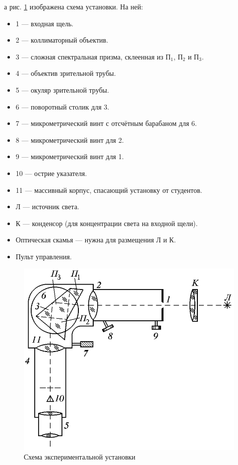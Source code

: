 \documentclass[a4paper, 12pt]{article}
\begin{document}
а рис. \ref{img:work} изображена схема установки. На ней:

\begin{itemize}
    \item 1 --- входная щель.
    \item 2 --- коллиматорный объектив.
    \item 3 --- сложная спектральная призма, склеенная из $П_1$, $П_2$ и $П_3$.
    \item 4 --- объектив зрительной трубы.
    \item 5 --- окуляр зрительной трубы.
    \item 6 --- поворотный столик для 3.
    \item 7 --- микрометрический винт с отсчётным барабаном для 6.
    \item 8 --- микрометрический винт для 2.
    \item 9 --- микрометрический винт для 1.
    \item 10 --- острие указателя.
    \item 11 --- массивный корпус, спасающий установку от студентов.
    \item Л --- источник света.
    \item К --- конденсор (для концентрации света на входной щели).
    \item Оптическая скамья --- нужна для размещения Л и К.
    \item Пульт управления.
\end{itemize}

\begin{figure}[!h]
    \includegraphics[scale = 0.4]{Workplace}
    \centering
    \caption{Схема экспериментальной установки}
    \label{img:work}
\end{figure}
\end{document}
